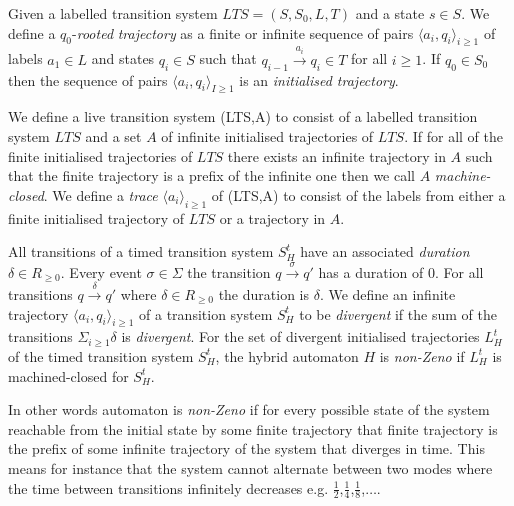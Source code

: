 \medskip
\begin{mydef}
Given a labelled transition system $LTS = (S,S_0,L,T)$ and a state $s \in S$. We define a $q_0$-\emph{rooted} \emph{trajectory} as a finite or infinite sequence of pairs $\langle a_i, q_i \rangle_{i \geq 1}$ of labels $a_1 \in L$ and states $q_i \in S$  such that $q_{i-1} \xrightarrow{a_i} q_{i} \in T$ for all $i \geq 1$. If $q_0 \in S_0$ then the sequence of pairs $\langle a_i, q_i \rangle_{I \geq 1}$ is an \emph{initialised trajectory}. 
\end{mydef}
\medskip
\begin{mydef}
We define a live transition system (LTS,A) to consist of a labelled transition system $LTS$ and a set $A$ of infinite initialised trajectories of $LTS$. If for all of the finite initialised trajectories of $LTS$ there exists an infinite trajectory in $A$ such that the finite trajectory is a prefix of the infinite one then we call $A$ \emph{machine-closed}. We define a \emph{trace} $\langle a_i \rangle_{i \geq 1}$ of (LTS,A) to consist of the labels from either a finite initialised trajectory of $LTS$ or a trajectory in $A$.
\end{mydef}
\medskip


\begin{mydef}
All transitions of a timed transition system $S^t_H$ have an associated \emph{duration} $\delta \in R_{\geq 0}$. Every event $\sigma \in \Sigma$ the transition $q \xrightarrow{\sigma} q'$ has a duration of 0. For all transitions $q \xrightarrow{\delta} q'$ where $\delta \in R_{\geq 0}$ the duration is $\delta$.  We define an infinite trajectory $\langle a_i, q_i \rangle_{i \geq 1}$ of a transition system $S^t_H$ to be \emph{divergent} if the sum of the transitions $\Sigma_{i \geq 1} \delta$ is \emph{divergent}. For the set of divergent initialised trajectories $L^t_H$ of the timed transition system $S^t_H$, the hybrid automaton $H$ is \emph{non-Zeno} if $L^t_H$ is machined-closed for $S^t_H$.
 \end{mydef}

In other words automaton is \emph{non-Zeno} if for every possible state of the system reachable from the initial state by some finite trajectory that finite trajectory is the prefix of some infinite trajectory of the system that diverges in time. This means for instance that the system cannot alternate between two modes where the time between transitions infinitely decreases e.g. $\frac{1}{2}$,$\frac{1}{4}$,$\frac{1}{8}$,$\ldots$.

